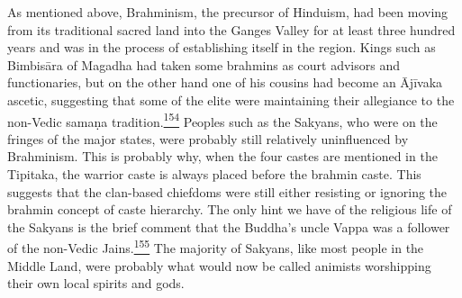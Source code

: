 As mentioned above, Brahminism, the precursor of Hinduism, had been
moving from its traditional sacred land into the Ganges Valley for at
least three hundred years and was in the process of establishing itself
in the region. Kings such as Bimbisāra of Magadha had taken some
brahmins as court advisors and functionaries, but on the other hand one
of his cousins had become an Ājīvaka ascetic, suggesting that some of
the elite were maintaining their allegiance to the non-Vedic samaṇa
tradition.\label{footprints_split_008.html_fnref154}\hyperref[footprints_split_024.htmlux5cux23fn154]{\textsuperscript{154}}
Peoples such as the Sakyans, who were on the fringes of the major
states, were probably still relatively uninfluenced by Brahminism. This
is probably why, when the four castes are mentioned in the Tipitaka, the
warrior caste is always placed before the brahmin caste. This suggests
that the clan-based chiefdoms were still either resisting or ignoring
the brahmin concept of caste hierarchy. The only hint we have of the
religious life of the Sakyans is the brief comment that the Buddha's
uncle Vappa was a follower of the non-Vedic
Jains.\label{footprints_split_008.html_fnref155}\hyperref[footprints_split_024.htmlux5cux23fn155]{\textsuperscript{155}}
The majority of Sakyans, like most people in the Middle Land, were
probably what would now be called animists worshipping their own local
spirits and gods.

